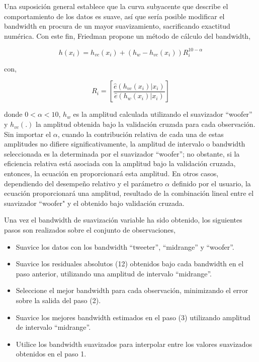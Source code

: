 \documentclass[
  12pt,
]{krantz}
\providecommand{\tightlist}{%
  \setlength{\itemsep}{0pt}\setlength{\parskip}{0pt}}
\begin{document}
Una suposición general establece que la curva subyacente que describe el comportamiento de los datos es suave, así que sería posible modificar el bandwidth en procura de un mayor suavizamiento, sacrificando exactitud numérica. Con este fin, Friedman \cite{F} propone un método de cálculo del bandwidth,

\[\displaystyle{h(x_{i}) = h_{vc}(x_{i}) + (h_{w} - h_{vc}(x_{i}))R_{i}^{10-\alpha}}\]

con,

\[\displaystyle{R_{i} = \left[\frac{\hat{e}(h_{vc}(x_{i})|x_{i})}{\hat{e}(h_{w}(x_{i})|x_{i})} \right] }\]

donde \(0 < \alpha < 10\), \(h_{w}\) es la amplitud calculada utilizando
el suavizador ``woofer'' y \(h_{vc}(.)\) la amplitud obtenida bajo la validación cruzada para cada observación. Sin importar el \(\alpha\), cuando la contribución relativa de cada una de estas amplitudes no difiere significativamente, la amplitud de intervalo o bandwidth seleccionada es la determinada por el suavizador ``woofer''; no obstante, si la eficiencia relativa está asociada con la amplitud bajo la validación cruzada, entonces, la ecuación en proporcionará esta amplitud. En otros casos, dependiendo del desempeño relativo y el parámetro \(\alpha\) definido por el usuario, la ecuación proporcionará una amplitud, resultado de la combinación lineal entre el suavizador ``woofer" \hspace*{0.01 cm} y el obtenido bajo validación cruzada.

Una vez el bandwidth de suavización variable ha sido obtenido, los siguientes pasos son realizados sobre el conjunto de observaciones,

\begin{itemize}
\tightlist
\item
  Suavice los datos con los bandwidth ``tweeter'', ``midrange'' y ``woofer''.
\item
  Suavice los residuales absolutos (12) obtenidos bajo cada bandwidth en el paso anterior, utilizando una amplitud de intervalo ``midrange''.
\item
  Seleccione el mejor bandwidth para cada observación, minimizando el error sobre la salida del paso (2).
\item
  Suavice los mejores bandwidth estimados en el paso (3) utilizando amplitud de intervalo ``midrange''.
\item
  Utilice los bandwidth suavizados para interpolar entre los valores suavizados obtenidos en el paso 1.
\end{itemize}
\end{document}
